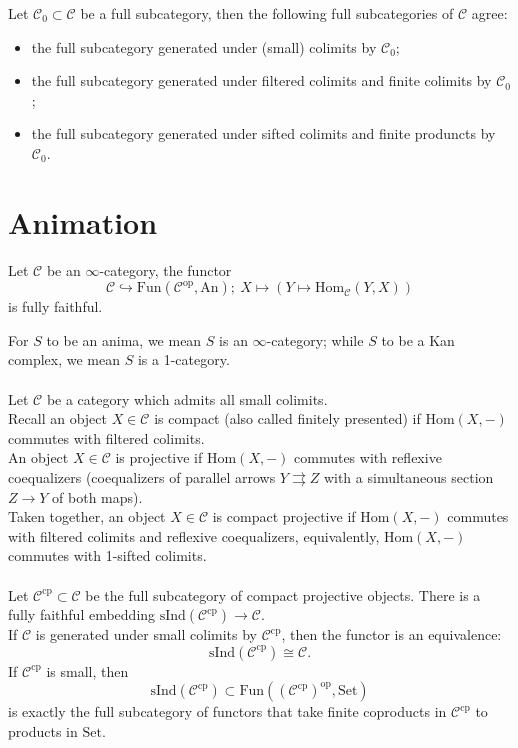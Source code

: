 \documentclass[UTF8,12,a4paper]{ctexart}
\theoremstyle{definition}
\begin{document}
\prop 

Let $\mathcal{C}_0\subset \mathcal{C}$ be a full subcategory, then the following full subcategories of $\mathcal{C}$ agree:
\begin{itemize}
	\item the full subcategory generated under (small) colimits by $\mathcal{C}_0$;
	\item the full subcategory generated under filtered colimits and finite colimits by $\mathcal{C}_0$;
	\item the full subcategory generated under sifted colimits and finite produncts by $\mathcal{C}_0$.
\end{itemize}




\newpage
\section{Animation}
\thm[Yoneda] 
Let $\mathcal{C}$ be an $\infty$-category, the functor $$\mathcal{C}\hookrightarrow\text{Fun}(\mathcal{C}^{\text{op}},\text{An});\ X\mapsto (Y\mapsto \text{Hom}_{\mathcal{C}}(Y,X))$$ is fully faithful.

\rem
For $S$ to be an anima, we mean $S$ is an $\infty$-category; while $S$ to be a Kan complex, we mean $S$ is a 1-category.
~\\
~\\
Let $\mathcal{C}$ be a category which admits all small colimits.\\ Recall an object $X\in\mathcal{C}$ is compact (also called finitely presented) if $\text{Hom}(X,-)$ commutes with filtered colimits.\\
An object $X\in\mathcal{C}$ is projective if $\text{Hom}(X,-)$ commutes with reflexive coequalizers (coequalizers of parallel arrows $Y\rightrightarrows Z$ with a simultaneous section $Z\to Y$ of both maps).\\
Taken together, an object $X\in\mathcal{C}$ is compact projective if $\text{Hom}(X,-)$ commutes with filtered colimits and reflexive coequalizers, equivalently, $\text{Hom}(X,-)$ commutes with 1-sifted colimits.\\
~\\
Let $\mathcal{C}^\text{cp}\subset \mathcal{C}$ be the full subcategory of compact projective objects. There is a fully faithful embedding $\text{sInd}(\mathcal{C}^\text{cp})\longrightarrow \mathcal{C}.$\\
If $\mathcal{C}$ is generated under small colimits by  $\mathcal{C}^\text{cp}$, then the functor is an equivalence:
$$\text{sInd}(\mathcal{C}^\text{cp})\cong \mathcal{C}.$$
If $\mathcal{C}^\text{cp}$ is small, then
$$\text{sInd}(\mathcal{C}^\text{cp})\subset\text{Fun}((\mathcal{C}^\text{cp})^\text{op}, \text{Set})  $$
is exactly the full subcategory of functors that take finite coproducts in $\mathcal{C}^\text{cp}$ to products in $\text{Set}.$
\end{document}
